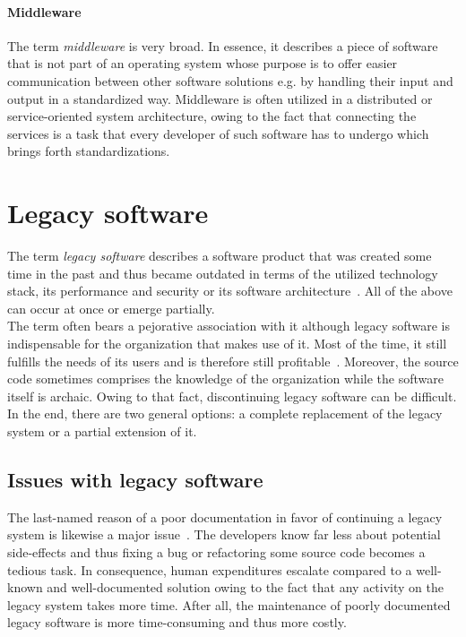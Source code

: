 \documentclass[12pt,a4paper]{report}
\begin{document}
\paragraph{Middleware}
The term \textit{middleware} is very broad. In essence, it describes a piece
of software that is not part of an operating system whose purpose is to
offer easier communication between other software solutions e.g. by handling
their input and output in a standardized way.
Middleware is often utilized in a distributed or service-oriented system architecture,
owing to the fact that connecting the services is a task that every developer
of such software has to undergo which brings forth standardizations.


\section{Legacy software} \label{sect:legacy-software}

The term \textit{legacy software} describes a software product that was created
some time in the past and thus became outdated in terms of the utilized technology
stack, its performance and security or its software architecture~\cite{seacord-modernizing-legacy}.
All of the above can occur at once or emerge partially.\\
The term often bears a pejorative association with it although legacy software
is indispensable for the organization that makes use of it. Most of the time, it
still fulfills the needs of its users and is therefore still profitable~\cite{bennett-coping-legacy}.
Moreover, the source code sometimes comprises the knowledge of the organization while
the software itself is archaic. Owing to that fact, discontinuing legacy software can be difficult.
In the end, there are two general options: a complete replacement of the legacy system or
a partial extension of it.


\subsection{Issues with legacy software} \label{issues-legacy-software}

The last-named reason of a poor documentation in favor of continuing a
legacy system is likewise a major issue~\cite{bisbal-legacy-issues}.
The developers know far less about potential side-effects and thus
fixing a bug or refactoring some source code becomes a tedious task.
In consequence, human expenditures escalate compared to a well-known and well-documented
solution owing to the fact that any activity on the legacy system takes more time.
After all, the maintenance of poorly documented legacy software
is more time-consuming and thus more costly.
\end{document}
